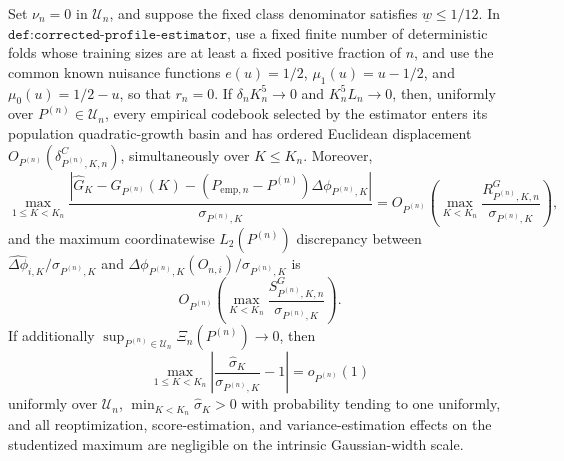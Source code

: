Set \(\nu_n=0\) in \(\mathcal U_n\), and suppose the fixed class denominator satisfies \(\underline w\leq1/12\).  In \(\texttt{def:corrected-profile-estimator}\), use a fixed finite number of deterministic folds whose training sizes are at least a fixed positive fraction of \(n\), and use the common known nuisance functions \(e(u)=1/2\), \(\mu_1(u)=u-1/2\), and \(\mu_0(u)=1/2-u\), so that \(r_n=0\).  If \(\delta_nK_n^5\to0\) and \(K_n^5L_n\to0\), then, uniformly over \(P^{(n)}\in\mathcal U_n\), every empirical codebook selected by the estimator enters its population quadratic-growth basin and has ordered Euclidean displacement \(O_{P^{(n)}}(\delta^C_{P^{(n)},K,n})\), simultaneously over \(K\leq K_n\).  Moreover,
\[
 \max_{1\leq K<K_n}\frac{|\widehat G_K-G_{P^{(n)}}(K)-(P_{\mathrm{emp},n}-P^{(n)})\Delta\phi_{P^{(n)},K}|}{\sigma_{P^{(n)},K}}
 =O_{P^{(n)}}\!\left(\max_{K<K_n}\frac{R^G_{P^{(n)},K,n}}{\sigma_{P^{(n)},K}}\right),
\]
and the maximum coordinatewise \(L_2(P^{(n)})\) discrepancy between \(\widehat{\Delta\phi}_{i,K}/\sigma_{P^{(n)},K}\) and \(\Delta\phi_{P^{(n)},K}(O_{n,i})/\sigma_{P^{(n)},K}\) is
\[
 O_{P^{(n)}}\!\left(\max_{K<K_n}\frac{S^G_{P^{(n)},K,n}}{\sigma_{P^{(n)},K}}\right).
\]
If additionally \(\sup_{P^{(n)}\in\mathcal U_n}\Xi_n(P^{(n)})\to0\), then
\[
 \max_{1\leq K<K_n}\left|\frac{\widehat\sigma_K}{\sigma_{P^{(n)},K}}-1\right|=o_{P^{(n)}}(1)
\]
uniformly over \(\mathcal U_n\), \(\min_{K<K_n}\widehat\sigma_K>0\) with probability tending to one uniformly, and all reoptimization, score-estimation, and variance-estimation effects on the studentized maximum are negligible on the intrinsic Gaussian-width scale.